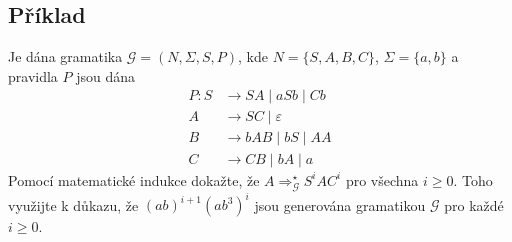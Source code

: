 \subsection{Příklad}
Je dána gramatika $\mathcal{G} = (N, \Sigma, S, P)$, kde $N = \{S, A, B, C\}$, $\Sigma = \{a,b\}$ a pravidla $P$ jsou dána
\begin{align*}
    P: S &\rightarrow SA \mid aSb \mid Cb\\
    A &\rightarrow SC \mid \varepsilon\\
    B &\rightarrow bAB \mid bS \mid AA\\
    C &\rightarrow CB \mid bA \mid a
\end{align*}
Pomocí matematické indukce dokažte, že $A \Rightarrow_\mathcal{G}^\star S^i A C^i$ pro všechna $i \geq 0$. Toho využijte 
k důkazu, že $(ab)^{i+1} (ab^3)^i$ jsou generována gramatikou $\mathcal{G}$ pro každé $i \geq 0$.